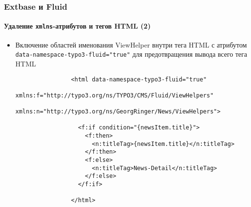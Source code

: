\begin{frame}[fragile]
	\frametitle{Extbase и Fluid}
	\framesubtitle{Удаление \texttt{xmlns}-атрибутов и тегов HTML (2)}

	\lstset{basicstyle=\tiny\ttfamily}

	\begin{itemize}

		\item Включение областей именования ViewHelper внутри тега HTML с атрибутом
			\texttt{data-namespace-typo3-fluid="true"} для предотвращения вывода
			всего тега HTML

			\begin{lstlisting}
				<html data-namespace-typo3-fluid="true"
				  xmlns:f="http://typo3.org/ns/TYPO3/CMS/Fluid/ViewHelpers"
				  xmlns:n="http://typo3.org/ns/GeorgRinger/News/ViewHelpers">

				  <f:if condition="{newsItem.title}">
				    <f:then>
				      <n:titleTag>{newsItem.title}</n:titleTag>
				    </f:then>
				    <f:else>
				      <n:titleTag>News-Detail</n:titleTag>
				    </f:else>
				  </f:if>

				</html>
			\end{lstlisting}

	\end{itemize}

\end{frame}


